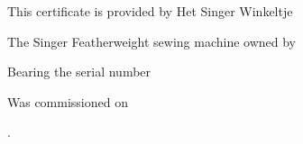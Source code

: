 \documentclass[a4paper]{article}
\begin{document}
\pagecolor{bg}

\begin{center}
\end{center}

\vspace{1cm}

\begin{center}
\end{center}


\def\setverb{\def\do##1{\catcode`##1=12}\dospecials }
\def\verbinput#1{\bgroup \setverb \unskip\egroup}

\begin{center}

\vspace{1cm}

This certificate is provided by Het Singer Winkeltje

\vspace{2cm}

The Singer Featherweight sewing machine owned by

\vspace{0.3cm}%
{\Large \verbinput{name.txt}}%
\vspace{1cm}

Bearing the serial number

\vspace{0.3cm}%
{\Large \verbinput{serial.txt}}%
\vspace{1cm}

Was commissioned on

\vspace{0.3cm}%
{\Large \verbinput{date.txt}}.%
\vspace{1cm}

\end{center}
\end{document}
